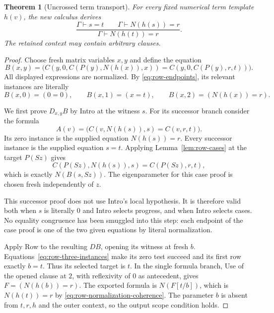 \documentclass[11pt,letterpaper]{article}
\newtheorem{theorem}{Theorem}[section]
\theoremstyle{definition}\newtheorem{definition}[theorem]{Definition}
\theoremstyle{remark}\newtheorem{remark}[theorem]{Remark}
\begin{document}
\begin{theorem}[Uncrossed term transport]
\label{thm:row-term-transport}
For every fixed numerical term template $h(v)$, the new calculus derives
\[
 \frac{\Gamma\vdash s=t\qquad\Gamma\vdash N(h(s))=r}
      {\Gamma\vdash N(h(t))=r}.
\]
The retained context may contain arbitrary clauses.
\end{theorem}
\begin{proof}
Choose fresh matrix variables $x,y$ and define the equation
\[
 B(x,y)=\bigl(
 C(y,0,C(P(y),N(h(x)),x))
 =C(y,0,C(P(y),r,t))\bigr).
\]
All displayed expressions are normalized.  By
\eqref{eq:row-endpoints}, its relevant instances are literally
\begin{equation}
 B(x,0)=(0=0),\qquad B(x,1)=(x=t),\qquad
 B(x,2)=(N(h(x))=r).
 \label{eq:row-three-instances}
\end{equation}

We first prove $D_{x,y}B$ by Intro at the witness $s$.  For its successor
branch consider the formula
\[
 A(v)=\bigl(C(v,N(h(s)),s)=C(v,r,t)\bigr).
\]
Its zero instance is the supplied equation $N(h(s))=r$.  Every successor
instance is the supplied equation $s=t$.  Applying
Lemma~\ref{lem:row-cases} at the target $P(Sz)$ gives
\[
 C(P(Sz),N(h(s)),s)=C(P(Sz),r,t),
\]
which is exactly $N(B(s,Sz))$.  The eigenparameter for this case proof is
chosen fresh independently of $z$.

This successor proof does not use Intro's local hypothesis.  It is
therefore valid both when $s$ is literally $0$ and Intro selects progress,
and when Intro selects cases.  No equality congruence has been smuggled
into this step: each endpoint of the case proof is one of the two given
equations by literal normalization.

Apply Row to the resulting $D B$, opening its witness at fresh $b$.
Equations~\eqref{eq:row-three-instances} make its zero test succeed and
its first row exactly $b=t$.  Thus its selected target is $t$.  In the
single formula branch, Use of the opened clause at $2$, with reflexivity
of $0$ as antecedent, gives $F=(N(h(b))=r)$.  The exported formula is
$N(F[t/b])$, which is $N(h(t))=r$ by
\eqref{eq:row-normalization-coherence}.  The parameter $b$ is absent from
$t,r,h$ and the outer context, so the output scope condition holds.
\end{proof}
\end{document}
